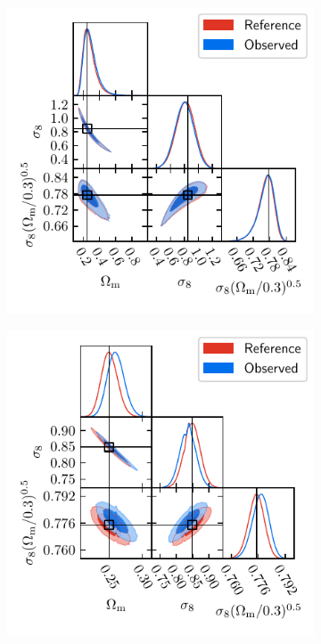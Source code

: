 \documentclass{aa}
\begin{document}
\begin{figure}
\begin{subfigure}{0.45\textwidth}
  \includegraphics[width=\textwidth]{images/mcmc_kids.pdf}
\end{subfigure}
\begin{subfigure}{0.45\textwidth}
  \includegraphics[width=\textwidth]{images/mcmc_euclid.pdf}

\end{subfigure}
\end{figure}
\end{document}
